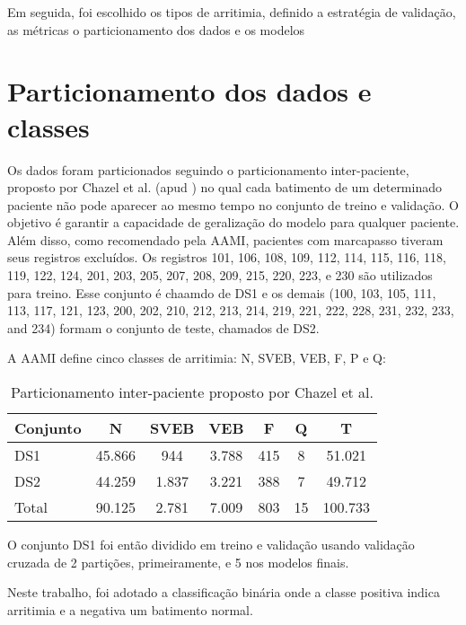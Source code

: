 \documentclass[
    12pt,                %
    openright,           %
    oneside,             %
    a4paper,             %
    brazil               %
]{abntex2}
\begin{document}
Em seguida, foi escolhido os tipos de arritimia, definido a estratégia de validação, as métricas o particionamento dos dados e os modelos


\section{Particionamento dos dados e classes}

Os dados foram particionados seguindo o particionamento inter-paciente, proposto por Chazel et al. (apud ) no qual cada batimento de um determinado paciente não pode aparecer ao mesmo tempo no conjunto de treino e validação. O objetivo é garantir a capacidade de geralização do modelo para qualquer paciente.
Além disso, como recomendado pela AAMI, pacientes com marcapasso tiveram seus registros excluídos. Os registros 101, 106, 108, 109, 112, 114, 115, 116, 118, 119, 122, 124, 201, 203, 205, 207, 208, 209, 215, 220, 223, e 230 são utilizados para treino. Esse conjunto é chaamdo de DS1 e os demais (100, 103, 105, 111, 113, 117, 121, 123, 200, 202, 210, 212, 213, 214, 219, 221, 222, 228, 231, 232, 233, and 234)
formam o conjunto de teste, chamados de DS2.

A AAMI define cinco classes de arritimia: N, SVEB, VEB, F, P e Q:

\begin{table}[htb] %
\centering
\caption{Particionamento inter-paciente proposto por Chazel et al.}
\label{tab:particionamento}
\begin{tabular}{|l|c|c|c|c|c|c|} %
\hline
Conjunto & N & SVEB & VEB & F & Q & T \\ \hline
DS1 & 45.866 & 944 & 3.788 & 415 &	8 &	51.021 \\ \hline
DS2 & 44.259 & 	1.837 & 3.221 &	388 & 7 & 49.712 \\ \hline
Total & 90.125 & 2.781 & 7.009 & 803 &	15 	& 100.733 \\ \hline
\end{tabular}
\end{table}

O conjunto DS1 foi então dividido em treino e validação usando validação cruzada de 2 partições, primeiramente, e 5 nos modelos finais. 

Neste trabalho, foi adotado a classificação binária onde a classe positiva indica arritimia e a negativa um batimento normal.
\end{document}
